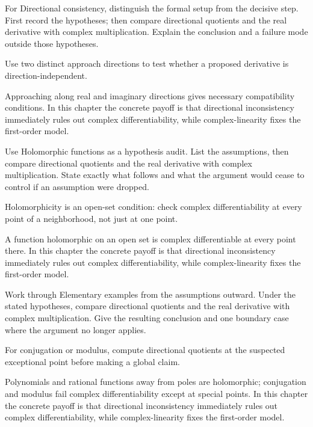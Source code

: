 \begin{exercise}\label{exr:iv01-03}
For Directional consistency, distinguish the formal setup from the decisive step. First record the hypotheses; then compare directional quotients and the real derivative with complex multiplication. Explain the conclusion and a failure mode outside those hypotheses.
\end{exercise}
\begin{hint}
Use two distinct approach directions to test whether a proposed derivative is direction-independent.
\end{hint}
\begin{solution}
Approaching along real and imaginary directions gives necessary compatibility conditions. In this chapter the concrete payoff is that directional inconsistency immediately rules out complex differentiability, while complex-linearity fixes the first-order model.
\end{solution}

\begin{exercise}\label{exr:iv01-04}
Use Holomorphic functions as a hypothesis audit. List the assumptions, then compare directional quotients and the real derivative with complex multiplication. State exactly what follows and what the argument would cease to control if an assumption were dropped.
\end{exercise}
\begin{hint}
Holomorphicity is an open-set condition: check complex differentiability at every point of a neighborhood, not just at one point.
\end{hint}
\begin{solution}
A function holomorphic on an open set is complex differentiable at every point there. In this chapter the concrete payoff is that directional inconsistency immediately rules out complex differentiability, while complex-linearity fixes the first-order model.
\end{solution}

\begin{exercise}\label{exr:iv01-05}
Work through Elementary examples from the assumptions outward. Under the stated hypotheses, compare directional quotients and the real derivative with complex multiplication. Give the resulting conclusion and one boundary case where the argument no longer applies.
\end{exercise}
\begin{hint}
For conjugation or modulus, compute directional quotients at the suspected exceptional point before making a global claim.
\end{hint}
\begin{solution}
Polynomials and rational functions away from poles are holomorphic; conjugation and modulus fail complex differentiability except at special points. In this chapter the concrete payoff is that directional inconsistency immediately rules out complex differentiability, while complex-linearity fixes the first-order model.
\end{solution}

